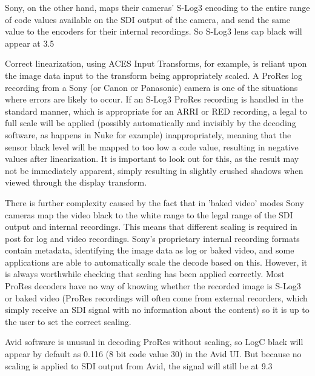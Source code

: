 Sony, on the other hand, maps their cameras' S-Log3 encoding to the entire range of code values available on the SDI output of the camera, and send the same value to the encoders for their internal recordings. So S-Log3 lens cap black will appear at 3.5%



Correct linearization, using ACES Input Transforms, for example, is reliant upon the image data input to the transform being appropriately scaled. A ProRes log recording from a Sony (or Canon or Panasonic) camera is one of the situations where errors are likely to occur. If an S-Log3 ProRes recording is handled in the standard manner, which is appropriate for an ARRI or RED recording, a legal to full scale will be applied (possibly automatically and invisibly by the decoding software, as happens in Nuke for example) inappropriately, meaning that the sensor black level will be mapped to too low a code value, resulting in negative values after linearization. It is important to look out for this, as the result may not be immediately apparent, simply resulting in slightly crushed shadows when viewed through the display transform.

There is further complexity caused by the fact that in 'baked video' modes Sony cameras map the video black to the white range to the legal range of the SDI output and internal recordings. This means that different scaling is required in post for log and video recordings. Sony's proprietary internal recording formats contain metadata, identifying the image data as log or baked video, and some applications are able to automatically scale the decode based on this. However, it is always worthwhile checking that scaling has been applied correctly.  Most ProRes decoders have no way of knowing whether the recorded image is S-Log3 or baked video (ProRes recordings will often come from external recorders, which simply receive an SDI signal with no information about the content) so it is up to the user to set the correct scaling.

Avid software is unusual in decoding ProRes without scaling, so LogC black will appear by default as 0.116 (8 bit code value 30) in the Avid UI. But because no scaling is applied to SDI output from Avid, the signal will still be at 9.3%


